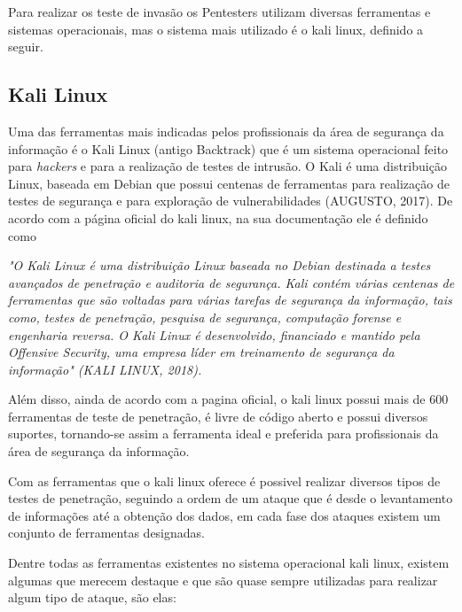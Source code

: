 Para realizar os teste de invasão os Pentesters utilizam diversas ferramentas e sistemas operacionais, mas o sistema mais utilizado é o kali linux, definido a seguir.

\subsection{Kali Linux}
	Uma das ferramentas mais indicadas pelos profissionais da área de segurança da informação é o Kali Linux (antigo Backtrack) que é um sistema operacional feito para \textit{hackers} e para a realização de testes de intrusão. O Kali é uma distribuição Linux, baseada em Debian que possui centenas de ferramentas para realização de testes de segurança e para exploração de vulnerabilidades (AUGUSTO, 2017).
    De acordo com a página oficial do kali linux, na sua documentação ele é definido como

\begin{flushright}
\small\it
	"O Kali Linux é uma distribuição Linux baseada no Debian destinada a testes avançados de penetração e auditoria de segurança. Kali contém várias centenas de ferramentas que são voltadas para várias tarefas de segurança da informação, tais como, testes de penetração, pesquisa de segurança, computação forense e engenharia reversa. O Kali Linux é desenvolvido, financiado e mantido pela Offensive Security, uma empresa líder em treinamento de segurança da informação" (KALI LINUX, 2018).
\end{flushright}

Além disso, ainda de acordo com a pagina oficial, o kali linux possui mais de 600 ferramentas de teste de penetração, é livre de código aberto e possui diversos suportes, tornando-se assim a ferramenta ideal e preferida para profissionais da área de segurança da informação.


Com as ferramentas que o kali linux oferece é possivel realizar diversos tipos de testes de penetração, seguindo a ordem de um ataque que é desde o levantamento de informações até a obtenção dos dados, em cada fase dos ataques existem um conjunto de ferramentas designadas.

Dentre todas as ferramentas existentes no sistema operacional kali linux, existem algumas que merecem destaque e que são quase sempre utilizadas para realizar algum tipo de ataque, são elas:

